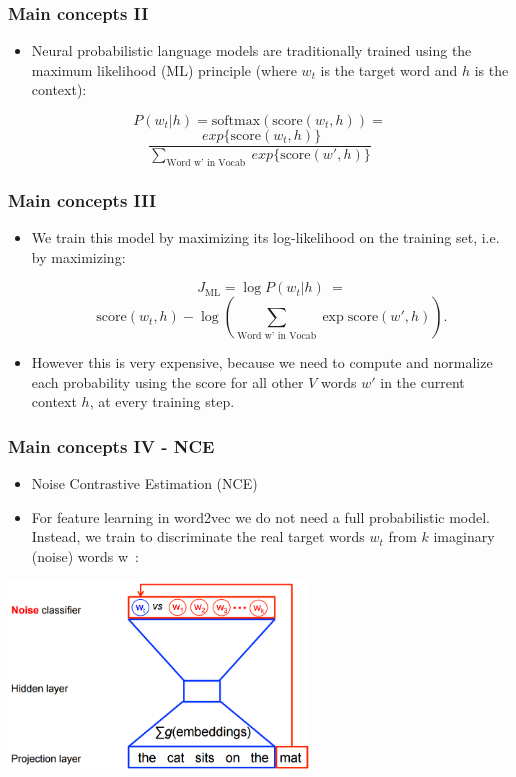 \documentclass{beamer}
\begin{document}
\begin{frame}
  \frametitle{Main concepts II}
  \begin{itemize}
     
    \item  Neural probabilistic language models are traditionally trained using the maximum likelihood (ML) principle (where $w_t$ is the target word and $h$ is the context):
	 
	 \end{itemize}

$$P(w_t | h) = \text{softmax}(\text{score}(w_t, h)) = $$
	$$ \frac{\ exp\{\text{score}(w_t, h) \} } {\sum_\text{Word w' in Vocab} \ exp\{ \text{score}(w', h) \}}$$	 
	 
\end{frame}

\begin{frame}
  \frametitle{Main concepts III}
  
    \begin{itemize}

	\item We train this model by maximizing its log-likelihood on the training set, i.e. by maximizing:

	$$  J_\text{ML} = \log P(w_t | h) \ = $$
	$$  \text{score}(w_t, h) - \log \left( \sum_\text{Word w' in Vocab} \exp { \text{score}(w', h) } \right). $$
	
	\item However this is very expensive, because we need to compute and normalize each probability using the score for all other $V$ words $w'$ in the current context $h$, at every training step.
	\end{itemize}
  
\end{frame} 

\begin{frame}
  \frametitle{Main concepts IV - NCE}
  
    \begin{itemize}
    \item Noise Contrastive Estimation (NCE)
	\item For feature learning in word2vec we do not need a full probabilistic model. Instead, we train to discriminate the real target words $w_t$ from $k$ imaginary (noise) words w~:
	
	\end{itemize}
	
	\begin{center}
	\includegraphics[width=0.6\textwidth]{04_w2v_02}
	\end{center}  
  
\end{frame} 
\end{document}
